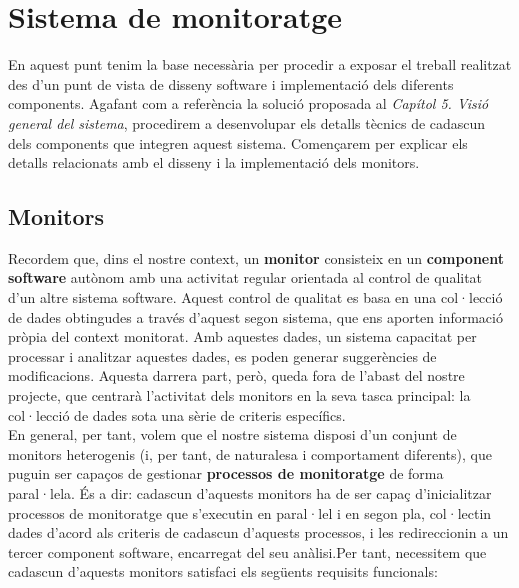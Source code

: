 
\chapter{Sistema de monitoratge} %

\label{SistemaMonitoratge} %

En aquest punt tenim la base necessària per procedir a exposar el treball realitzat des d'un punt de vista de disseny software i implementació dels diferents components. Agafant com a referència la solució proposada al \textit{Capítol 5. Visió general del sistema}, procedirem a desenvolupar els detalls tècnics de cadascun dels components que integren aquest sistema. Començarem per explicar els detalls relacionats amb el disseny i la implementació dels monitors.

\section{Monitors}

Recordem que, dins el nostre context, un \textbf{monitor} consisteix en un \textbf{component software} autònom amb una activitat regular orientada al control de qualitat d'un altre sistema software. Aquest control de qualitat es basa en una col·lecció de dades obtingudes a través d'aquest segon sistema, que ens aporten informació pròpia del context monitorat. Amb aquestes dades, un sistema capacitat per processar i analitzar aquestes dades, es poden generar suggerències de modificacions. Aquesta darrera part, però, queda fora de l'abast del nostre projecte, que centrarà l'activitat dels monitors en la seva tasca principal: la col·lecció de dades sota una sèrie de criteris específics.\\

En general, per tant, volem que el nostre sistema disposi d'un conjunt de monitors heterogenis (i, per tant, de naturalesa i comportament diferents), que puguin ser capaços de gestionar \textbf{processos de monitoratge} de forma paral·lela. És a dir: cadascun d'aquests monitors ha de ser capaç d'inicialitzar processos de monitoratge que s'executin en paral·lel i en segon pla, col·lectin dades d'acord als criteris de cadascun d'aquests processos, i les redireccionin a un tercer component software, encarregat del seu anàlisi.Per tant, necessitem que cadascun d'aquests monitors satisfaci els següents requisits funcionals:


